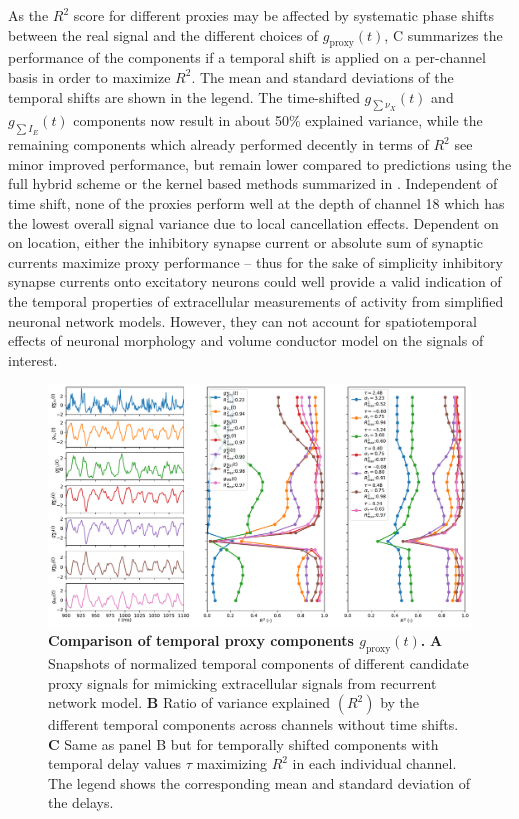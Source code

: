 As the $R^2$ score for different proxies may be affected by systematic phase shifts between the real signal and the different choices of $g_\text{proxy}(t)$, 
C summarizes the performance of the components if a temporal shift is applied on a per-channel  basis in order to maximize $R^2$. 
The mean and standard deviations of the temporal shifts are shown in the legend. 
The time-shifted $g_{\sum \nu_X}(t)$ and $g_{\sum I_E}(t)$ components now result in about 50\% explained variance, 
while the remaining components which already performed decently in terms of $R^2$ see minor improved performance, 
but remain lower compared to predictions using the full hybrid scheme or the kernel based methods summarized in . 
Independent of time shift, none of the proxies perform well at the depth of channel 18 which has the lowest overall signal variance due to local cancellation effects.
Dependent on on location, 
either the inhibitory synapse current or absolute sum of synaptic currents maximize proxy performance 
-- thus for the sake of simplicity inhibitory synapse currents onto excitatory neurons could well provide a valid indication of the temporal properties of extracellular measurements of activity from simplified neuronal network models. 
However, they can not account for spatiotemporal effects of neuronal morphology and volume conductor model on the signals of interest. 


\begin{figure}[!ht]
\begin{center}
\includegraphics[width=\textwidth]{Figures/Ch-LFPy/Ch-LFPy-g_proxy.pdf}
\end{center}
\caption{\textbf{Comparison of temporal proxy components $g_\text{proxy}(t)$.} 
{\bf A} Snapshots of normalized temporal components of different candidate proxy signals for mimicking extracellular signals from recurrent network model. 
{\bf B} Ratio of variance explained $(R^2)$ by the different temporal components across channels without time shifts. 
{\bf C} Same as panel B but for temporally shifted components with temporal delay values $\tau$ maximizing $R^2$ in each individual channel. 
The legend shows the corresponding mean and standard deviation of the delays.
}
\label{fig:g_proxy}
\end{figure}



